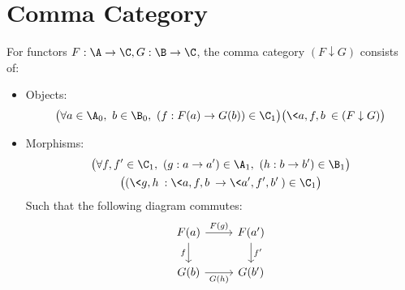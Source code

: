 \section{Comma Category}
\begin{definition}
  For functors $F:\A\to \C, G:\B\to \C$, the comma category $(F\downarrow G)$
  consists of:~\parencite[p.~59]{leinster:basic_category_theory}
  \begin{itemize}
    \item Objects:
      \[\big(\forall a\in \A_0,\ b\in \B_0,\ (f: F(a) \to G(b))\in \C_1\big)
        \big(\< a, f, b\>\in (F\downarrow G)\big)\]
    \item Morphisms:
      \[
        \begin{gathered}
          \big(\forall f, f'\in \C_1,
            \ (g: a \to a')\in \A_1,\ (h: b\to b')\in \B_1\big)\\
          \big((\<g, h\> : \<a, f, b\> \to \<a', f', b'\>)\in \C_1\big)
        \end{gathered}
      \]
      Such that the following diagram commutes:
      \[\begin{tikzcd} {F(a)} & {F(a')} \\
        {G(b)} & {G(b')}
        \arrow["{F(g)}", from=1-1, to=1-2]
        \arrow["{G(h)}"', from=2-1, to=2-2]
        \arrow["f"', from=1-1, to=2-1]
        \arrow["{f'}", from=1-2, to=2-2]
      \end{tikzcd}\]
  \end{itemize}
\end{definition}

